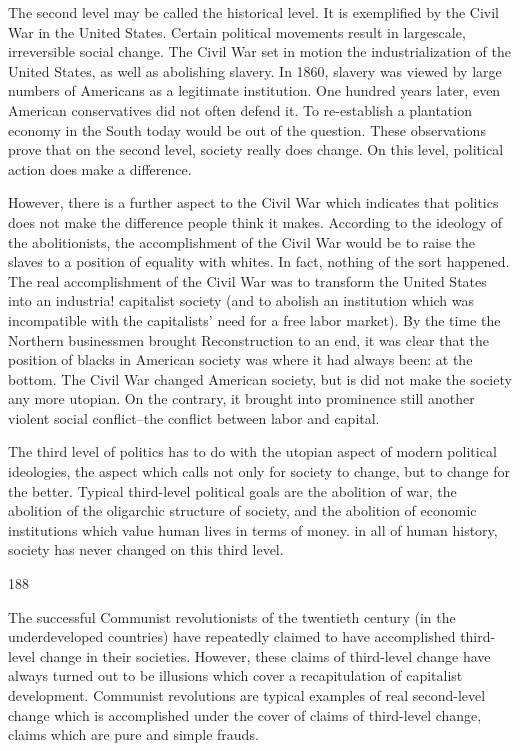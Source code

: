 \documentclass[10pt,twoside]{memoir}
\begin{document}
\begin{enumerate}
{\begin{enumerate}
\begin{sysrules}
\begin{sysrules}
\begin{sysrules}
\begin{sysrules}
{\begin{enumerate}
{{{{{{{{The second level may be called the historical level. It is exemplified by 
the Civil War in the United States. Certain political movements result in 
largescale, irreversible social change. The Civil War set in motion the 
industrialization of the United States, as well as abolishing slavery. In 1860, 
slavery was viewed by large numbers of Americans as a legitimate institution. 
One hundred years later, even American conservatives did not often defend 
it. To re-establish a plantation economy in the South today would be out of 
the question. These observations prove that on the second level, society 
really does change. On this level, political action does make a difference. 

However, there is a further aspect to the Civil War which indicates that 
politics does not make the difference people think it makes. According to 
the ideology of the abolitionists, the accomplishment of the Civil War would 
be to raise the slaves to a position of equality with whites. In fact, nothing of 
the sort happened. The real accomplishment of the Civil War was to 
transform the United States into an industria! capitalist society (and to 
abolish an institution which was incompatible with the capitalists' need for a 
free labor market). By the time the Northern businessmen brought 
Reconstruction to an end, it was clear that the position of blacks in 
American society was where it had always been: at the bottom. The Civil 
War changed American society, but is did not make the society any more 
utopian. On the contrary, it brought into prominence still another violent 
social conflict--the conflict between labor and capital. 

The third level of politics has to do with the utopian aspect of modern 
political ideologies, the aspect which calls not only for society to change, but 
to change for the better. Typical third-level political goals are the abolition 
of war, the abolition of the oligarchic structure of society, and the abolition 
of economic institutions which value human lives in terms of money. in all 
of human history, society has never changed on this third level. 


188 


The successful Communist revolutionists of the twentieth century (in 
the underdeveloped countries) have repeatedly claimed to have accomplished 
third-level change in their societies. However, these claims of third-level 
change have always turned out to be illusions which cover a recapitulation of 
capitalist development. Communist revolutions are typical examples of real 
second-level change which is accomplished under the cover of claims of 
third-level change, claims which are pure and simple frauds. 

}}}}}}}}
\end{enumerate}}
\end{sysrules}
\end{sysrules}
\end{sysrules}
\end{sysrules}
\end{enumerate}}
\end{enumerate}
\end{document}
